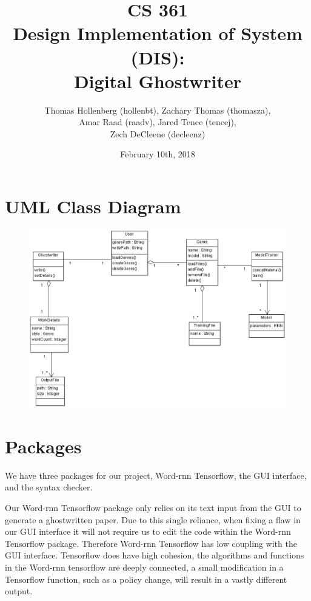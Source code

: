 \documentclass[12pt]{article}
\title{CS 361 \\ Design Implementation of System (DIS): \\ Digital Ghostwriter}
\author{Thomas Hollenberg (hollenbt), Zachary Thomas (thomasza),\\ Amar Raad (raadv), Jared Tence (tencej), \\  Zech DeCleene (decleenz)}
\date{February 10th, 2018}
\begin{document}
\maketitle
\newpage
\tableofcontents

\newpage

\section{UML Class Diagram}

\begin{figure}[ht]
  \centering
    \includegraphics[scale=0.7]{ClassDiagram.eps}
\end{figure}

\newpage

\section{Packages}

We have three packages for our project, Word-rnn Tensorflow, the GUI interface, and the syntax checker.

Our Word-rnn Tensorflow package only relies on its text input from the GUI to generate a ghostwritten paper. Due to this single reliance, when fixing a flaw in our GUI interface it will not require us to edit the code within the Word-rnn Tensorflow package. Therefore Word-rnn Tensorflow has low coupling with the GUI interface. Tensorflow does have high cohesion, the algorithms and functions in the Word-rnn tensorflow are deeply connected, a small modification in a Tensorflow function, such as a policy change, will result in a vastly different output.
\end{document}
